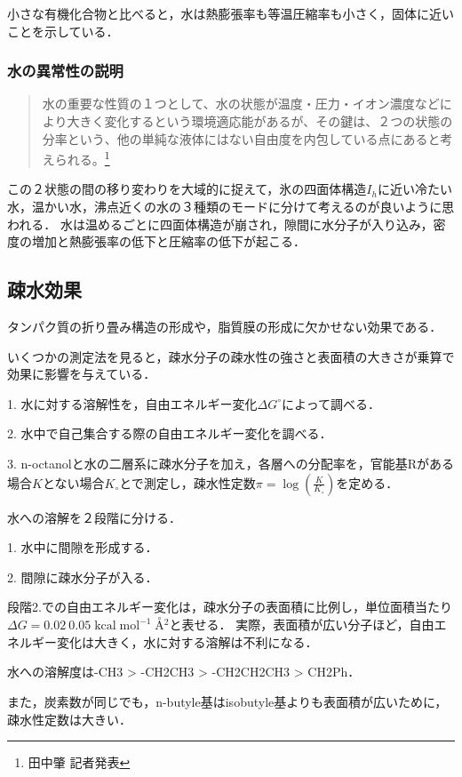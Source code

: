 \documentclass[uplatex, dvipdfmx]{jsreport}
\begin{document}
小さな有機化合物と比べると，水は熱膨張率も等温圧縮率も小さく，固体に近いことを示している．

\subsubsection{水の異常性の説明}

\begin{quote}
    水の重要な性質の１つとして、水の状態が温度・圧力・イオン濃度などにより大きく変化するという環境適応能があるが、その鍵は、２つの状態の分率という、他の単純な液体にはない自由度を内包している点にあると考えられる。\footnote{田中肇 記者発表}
\end{quote}

この２状態の間の移り変わりを大域的に捉えて，氷の四面体構造$I_h$に近い冷たい水，温かい水，沸点近くの水の３種類のモードに分けて考えるのが良いように思われる．
水は温めるごとに四面体構造が崩され，隙間に水分子が入り込み，密度の増加と熱膨張率の低下と圧縮率の低下が起こる．

\subsection{疎水効果}
タンパク質の折り畳み構造の形成や，脂質膜の形成に欠かせない効果である．

いくつかの測定法を見ると，疎水分子の疎水性の強さと表面積の大きさが乗算で効果に影響を与えている．

\begin{method}[疎水効果の評価]
    1. 水に対する溶解性を，自由エネルギー変化$\Delta G^\circ$によって調べる．

    2. 水中で自己集合する際の自由エネルギー変化を調べる．

    3. n-octanolと水の二層系に疎水分子を加え，各層への分配率を，官能基Rがある場合$K$とない場合$K_\circ$とで測定し，疎水性定数$\pi=\log\left(\frac{K}{K_\circ}\right)$を定める．
\end{method}

\begin{theory}
    水への溶解を２段階に分ける．

    1. 水中に間隙を形成する．

    2. 間隙に疎水分子が入る．

    段階2.での自由エネルギー変化は，疎水分子の表面積に比例し，単位面積当たり$\Delta G=0.02~0.05\; \mathrm{kcal\;mol^{-1}\;\overset{\circ}{A}\!{}^2}$と表せる．
    実際，表面積が広い分子ほど，自由エネルギー変化は大きく，水に対する溶解は不利になる．
\end{theory}
\begin{example}
    水への溶解度は-CH3 > -CH2CH3 > -CH2CH2CH3 > CH2Ph．

    また，炭素数が同じでも，n-butyle基はisobutyle基よりも表面積が広いために，疎水性定数は大きい．
\end{example}
\end{document}

